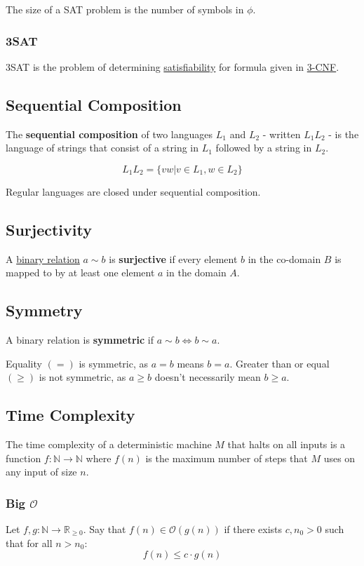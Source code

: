 \documentclass{article}
\begin{document}
The size of a SAT problem is the number of symbols in $\phi$.

\subsubsection{3SAT}
3SAT is the problem of determining \hyperref[sat]{satisfiability} for formula given in \hyperref[cnf]{3-CNF}.


\subsection{Sequential Composition}\label{sequential-composition}
The \textbf{sequential composition} of two languages $L_1$ and $L_2$ - written $L_1L_2$ - is the language of strings that consist of a string in $L_1$ followed by a string in $L_2$.

\[ L_1L_2=\{vw | v \in L_1, w \in L_2\} \]

Regular languages are closed under sequential composition.


\subsection{Surjectivity}\label{surjective}
A \hyperref[binary-relation]{binary relation} $a \sim b$ is \textbf{surjective} if every element $b$ in the co-domain $B$ is mapped to by at least one element $a$ in the domain $A$.


\subsection{Symmetry}\label{symmetric}
A binary relation is \textbf{symmetric} if $a \sim b \Leftrightarrow b \sim a$.

Equality $(=)$ is symmetric, as $a = b$ means $b = a$. Greater than or equal $(\geq)$ is not symmetric, as $a \geq b$ doesn't necessarily mean $b \geq a$.


\subsection{Time Complexity}\label{time-complexity}
The time complexity of a deterministic machine $M$ that halts on all inputs is a function $f : \mathbb{N} \to \mathbb{N}$ where $f(n)$ is the maximum number of steps that $M$ uses on any input of size $n$.

\subsubsection{Big $\mathcal{O}$}
Let $f, g : \mathbb{N} \to \mathbb{R}_{\geq 0}$. Say that $f(n) \in \mathcal{O}(g(n))$ if there exists $c, n_0 > 0$ such that for all $n > n_0$: 
\[f(n) \leq c \cdot g(n)\]
\end{document}
